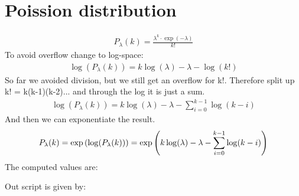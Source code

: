 \section{Poission distribution}
\begin{align}
    P_\lambda (k) = \frac{\lambda^k \cdot \exp(-\lambda)}{k!}
\end{align}
To avoid overflow change to log-space: 
\begin{align}
    \log(P_\lambda (k)) = k \log(\lambda) -\lambda -\log(k!)
\end{align}
So far we avoided division, but we still get an overflow for k!. Therefore split up k! = k(k-1)(k-2)... and through the log it is just a sum. 
\begin{align}
    \log(P_\lambda (k)) = k \log(\lambda) -\lambda - \sum_{i=0}^{k-1} \log(k-i)
\end{align}
And then we can exponentiate the result.
\begin{align}
    P_\lambda (k) = \exp\left({\log(P_\lambda (k))}\right) = \exp\left({k \log(\lambda) -\lambda - \sum_{i=0}^{k-1} \log(k-i)}\right)
\end{align}
The computed values are:

Out script is given by:
